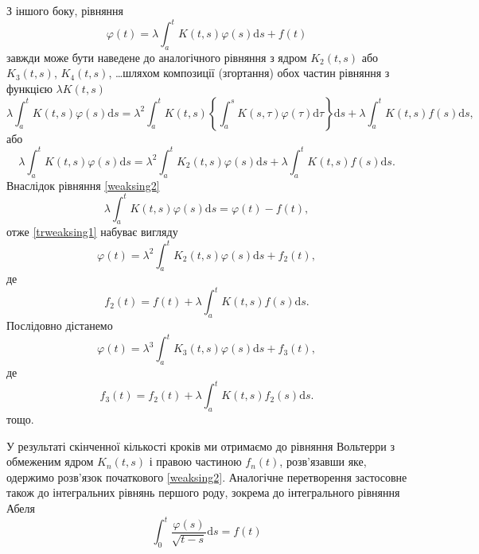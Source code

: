 \documentclass[14pt,twoside]{extreport}
\theoremstyle{mystyle}
\numberwithin{equation}{chapter}
\begin{document}
З іншого боку, рівняння
\begin{equation}
\varphi(t) = \lambda \int_{a}^{t} K(t, s) \varphi(s) \mathrm{d}s + f(t)
\end{equation}
завжди може бути наведене до аналогічного рівняння з ядром $K_2(t, s)$ або $K_3(t, s)$, $K_4(t, s)$, \ldots шляхом композиції (згортання) обох частин рівняння з функцією $\lambda K(t, s)$
\[
\lambda \int_{a}^{t} K(t, s) \varphi(s) \mathrm{d}s = \lambda^2 \int_{a}^{t} K(t, s) \left\{\int_{a}^{s} K(s, \tau) \varphi(\tau)\mathrm{d}\tau\right\}\mathrm{d}s + \lambda \int_{a}^{t} K(t, s) f(s) \mathrm{d}s,
\]
або
\begin{equation}\label{trweaksing1}
\lambda \int_{a}^{t} K(t, s) \varphi(s) \mathrm{d}s = \lambda^2 \int_{a}^{t} K_2(t,s) \varphi(s) \mathrm{d}s + \lambda\int_{a}^{t} K(t, s) f(s) \mathrm{d}s.
\end{equation}
Внаслідок рівняння \eqref{weaksing2}
\[
\lambda \int_{a}^{t} K(t, s) \varphi(s) \mathrm{d}s = \varphi(t) - f(t),
\]
отже \eqref{trweaksing1} набуває вигляду
\begin{equation}
\varphi(t) = \lambda^2 \int_{a}^{t} K_2(t, s)\varphi(s) \mathrm{d}s + f_2(t),
\end{equation}
де
\[
f_2(t) = f(t) + \lambda \int_{a}^{t} K(t, s) f(s)\mathrm{d}s.
\]
Послідовно дістанемо
\[
\varphi(t) = \lambda^3 \int_{a}^{t} K_3(t, s)\varphi(s) \mathrm{d}s + f_3(t),
\]
де
\[
f_3(t) = f_2(t) + \lambda \int_{a}^{t} K(t, s) f_2(s)\mathrm{d}s.
\]
тощо.

У результаті скінченної кількості кроків ми отримаємо до рівняння Вольтерри з обмеженим ядром $K_n(t, s)$ і правою частиною $f_n(t)$, розв'язавши яке, одержимо розв'язок початкового \eqref{weaksing2}. Аналогічне перетворення застосовне також до інтегральних рівнянь першого роду, зокрема до інтегрального рівняння Абеля
\begin{equation}\label{abelsing}
\int_{0}^{t} \frac{\varphi(s)}{\sqrt{t-s}}\mathrm{d}s = f(t)
\end{equation}
\end{document}
